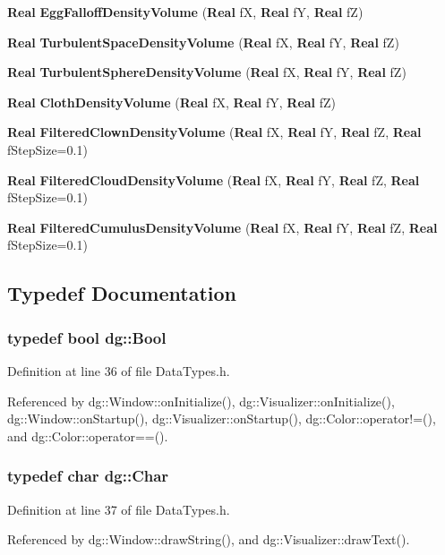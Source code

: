 \begin{CompactItemize}
\item 
{\bf Real} {\bf Egg\-Falloff\-Density\-Volume} ({\bf Real} f\-X, {\bf Real} f\-Y, {\bf Real} f\-Z)
\item 
{\bf Real} {\bf Turbulent\-Space\-Density\-Volume} ({\bf Real} f\-X, {\bf Real} f\-Y, {\bf Real} f\-Z)
\item 
{\bf Real} {\bf Turbulent\-Sphere\-Density\-Volume} ({\bf Real} f\-X, {\bf Real} f\-Y, {\bf Real} f\-Z)
\item 
{\bf Real} {\bf Cloth\-Density\-Volume} ({\bf Real} f\-X, {\bf Real} f\-Y, {\bf Real} f\-Z)
\item 
{\bf Real} {\bf Filtered\-Clown\-Density\-Volume} ({\bf Real} f\-X, {\bf Real} f\-Y, {\bf Real} f\-Z, {\bf Real} f\-Step\-Size=0.1)
\item 
{\bf Real} {\bf Filtered\-Cloud\-Density\-Volume} ({\bf Real} f\-X, {\bf Real} f\-Y, {\bf Real} f\-Z, {\bf Real} f\-Step\-Size=0.1)
\item 
{\bf Real} {\bf Filtered\-Cumulus\-Density\-Volume} ({\bf Real} f\-X, {\bf Real} f\-Y, {\bf Real} f\-Z, {\bf Real} f\-Step\-Size=0.1)
\end{CompactItemize}


\subsection{Typedef Documentation}
\subsubsection{\setlength{\rightskip}{0pt plus 5cm}typedef bool dg::Bool}\label{namespacedg_a9}




Definition at line 36 of file Data\-Types.h.

Referenced by dg::Window::on\-Initialize(), dg::Visualizer::on\-Initialize(), dg::Window::on\-Startup(), dg::Visualizer::on\-Startup(), dg::Color::operator!=(), and dg::Color::operator==().
\subsubsection{\setlength{\rightskip}{0pt plus 5cm}typedef char dg::Char}\label{namespacedg_a10}




Definition at line 37 of file Data\-Types.h.

Referenced by dg::Window::draw\-String(), and dg::Visualizer::draw\-Text().
